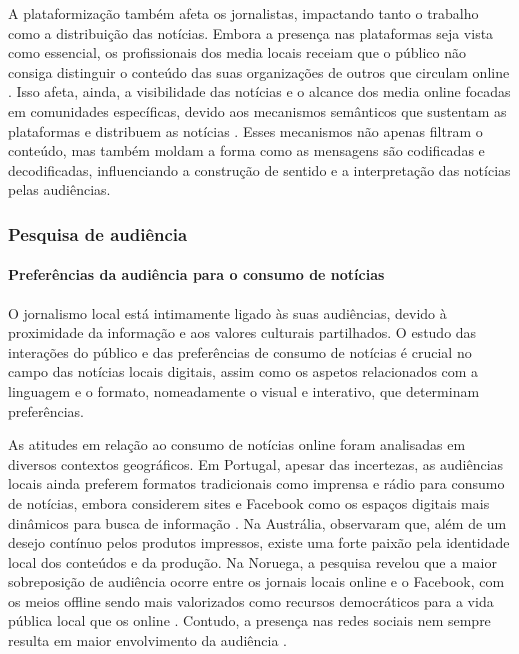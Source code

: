 \documentclass[portuguese]{textolivre}
\begin{document}
A plataformização também afeta os jornalistas, impactando tanto o trabalho como a distribuição das notícias. Embora a presença nas plataformas seja vista como essencial, os profissionais dos media locais receiam que o público não consiga distinguir o conteúdo das suas organizações de outros que circulam online \cite{morais2023}. Isso afeta, ainda, a visibilidade das notícias e o alcance dos media online focadas em comunidades específicas, devido aos mecanismos semânticos que sustentam as plataformas e distribuem as notícias \cite{ivancsics2023}. Esses mecanismos não apenas filtram o conteúdo, mas também moldam a forma como as mensagens são codificadas e decodificadas, influenciando a construção de sentido e a interpretação das notícias pelas audiências.


\subsubsection{Pesquisa de audiência}
\paragraph{Preferências da audiência para o consumo de notícias}
O jornalismo local está intimamente ligado às suas audiências, devido à proximidade da informação e aos valores culturais partilhados. O estudo das interações do público e das preferências de consumo de notícias é crucial no campo das notícias locais digitais, assim como os aspetos relacionados com a linguagem e o formato, nomeadamente o visual e interativo, que determinam preferências.

As atitudes em relação ao consumo de notícias online foram analisadas em diversos contextos geográficos. Em Portugal, apesar das incertezas, as audiências locais ainda preferem formatos tradicionais como imprensa e rádio para consumo de notícias, embora considerem sites e Facebook como os espaços digitais mais dinâmicos para busca de informação \cite{ribeiro2021}. Na Austrália, \textcite{hess2023} observaram que, além de um desejo contínuo pelos produtos impressos, existe uma forte paixão pela identidade local dos conteúdos e da produção. Na Noruega, a pesquisa revelou que a maior sobreposição de audiência ocorre entre os jornais locais online e o Facebook, com os meios offline sendo mais valorizados como recursos democráticos para a vida pública local que os online \cite{olsen2020}. Contudo, a presença nas redes sociais nem sempre resulta em maior envolvimento da audiência \cite{solvoll2020}.
\end{document}
